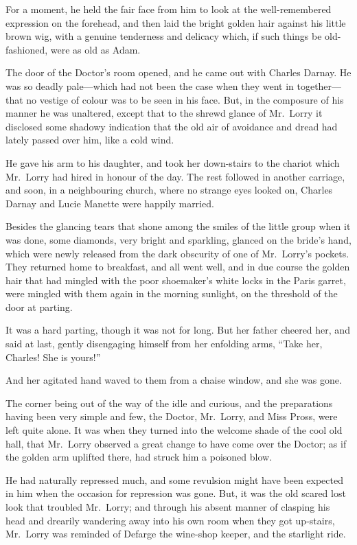 For a moment, he held the fair face from him to look at the
well-remembered expression on the forehead, and then laid the bright
golden hair against his little brown wig, with a genuine tenderness and
delicacy which, if such things be old-fashioned, were as old as Adam.

The door of the Doctor's room opened, and he came out with Charles
Darnay.  He was so deadly pale---which had not been the case when they
went in together---that no vestige of colour was to be seen in his face.
But, in the composure of his manner he was unaltered, except that to
the shrewd glance of Mr.\ Lorry it disclosed some shadowy indication
that the old air of avoidance and dread had lately passed over him,
like a cold wind.

He gave his arm to his daughter, and took her down-stairs to the chariot
which Mr.\ Lorry had hired in honour of the day.  The rest followed in
another carriage, and soon, in a neighbouring church, where no strange
eyes looked on, Charles Darnay and Lucie Manette were happily married.

Besides the glancing tears that shone among the smiles of the little
group when it was done, some diamonds, very bright and sparkling,
glanced on the bride's hand, which were newly released from the dark
obscurity of one of Mr.\ Lorry's pockets.  They returned home to
breakfast, and all went well, and in due course the golden hair that
had mingled with the poor shoemaker's white locks in the Paris garret,
were mingled with them again in the morning sunlight, on the threshold
of the door at parting.

It was a hard parting, though it was not for long.  But her father
cheered her, and said at last, gently disengaging himself from her
enfolding arms, ``Take her, Charles!  She is yours!''

And her agitated hand waved to them from a chaise window, and
she was gone.

The corner being out of the way of the idle and curious, and the
preparations having been very simple and few, the Doctor, Mr.\ Lorry,
and Miss Pross, were left quite alone.  It was when they turned into
the welcome shade of the cool old hall, that Mr.\ Lorry observed a
great change to have come over the Doctor; as if the golden arm
uplifted there, had struck him a poisoned blow.

He had naturally repressed much, and some revulsion might have been
expected in him when the occasion for repression was gone.  But, it
was the old scared lost look that troubled Mr.\ Lorry; and through
his absent manner of clasping his head and drearily wandering away
into his own room when they got up-stairs, Mr.\ Lorry was reminded of
Defarge the wine-shop keeper, and the starlight ride.

